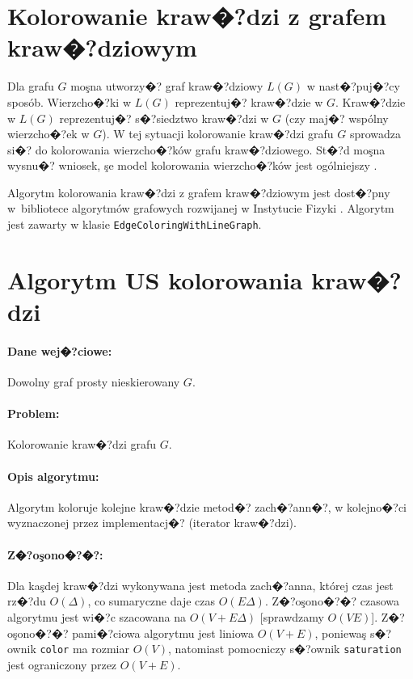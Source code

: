 \documentclass[12pt,a4paper]{mwrep}
\begin{document}
\section{Kolorowanie kraw�?dzi z grafem kraw�?dziowym}
\label{sec:graf_krawedziowy}

Dla grafu $G$ moşna utworzy�? graf kraw�?dziowy $L(G)$ w nast�?puj�?cy sposób.
Wierzcho�?ki w $L(G)$ reprezentuj�? kraw�?dzie w $G$.
Kraw�?dzie w $L(G)$ reprezentuj�? s�?siedztwo kraw�?dzi w $G$
(czy maj�? wspólny wierzcho�?ek w $G$).
W tej sytuacji kolorowanie kraw�?dzi grafu $G$ sprowadza si�?
do kolorowania wierzcho�?ków grafu kraw�?dziowego.
St�?d moşna wysnu�? wniosek, şe model kolorowania wierzcho�?ków
jest ogólniejszy \cite{Wojciechowski}.

Algorytm kolorowania kraw�?dzi z grafem kraw�?dziowym
jest dost�?pny w~bibliotece
algorytmów grafowych rozwijanej w Instytucie Fizyki
\cite{graphs-dict}. Algorytm jest zawarty w klasie
\lstinline|EdgeColoringWithLineGraph|.


\section{Algorytm US kolorowania kraw�?dzi}
\label{sec:kolorowanie_krawedzi_us}

\paragraph{Dane wej�?ciowe:} Dowolny graf prosty nieskierowany $G$.

\paragraph{Problem:} Kolorowanie kraw�?dzi grafu $G$.

\paragraph{Opis algorytmu:} Algorytm koloruje kolejne kraw�?dzie
metod�? zach�?ann�?, w kolejno�?ci wyznaczonej przez implementacj�?
(iterator kraw�?dzi).

\paragraph{Z�?oşono�?�?:} Dla kaşdej kraw�?dzi wykonywana jest metoda
zach�?anna, której czas jest rz�?du $O(\Delta)$,
co sumaryczne daje czas $O(E \Delta)$.
Z�?oşono�?�? czasowa algorytmu jest wi�?c szacowana na $O(V+E\Delta)$
[sprawdzamy $O(V E)$].
Z�?oşono�?�? pami�?ciowa algorytmu jest liniowa $O(V+E)$,
poniewaş s�?ownik \lstinline|color| ma rozmiar $O(V)$, natomiast 
pomocniczy s�?ownik \lstinline|saturation| jest ograniczony przez $O(V+E)$.
\end{document}
